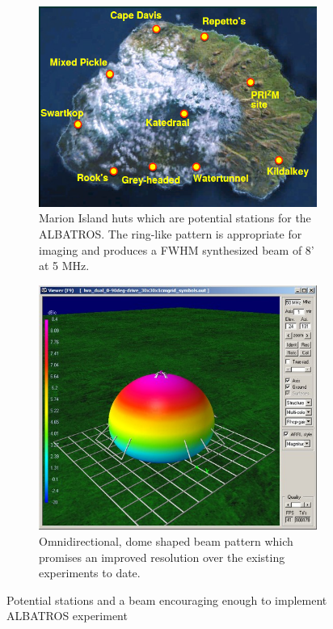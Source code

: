 \documentclass[12pt,a4paper]{report}
\begin{document}
		\begin{figure}[!htb]
			\centering
			\begin{subfigure}{.58\textwidth}
				\centering
				\includegraphics[width=.9\linewidth]{Figures/site.PNG}
				\caption{Marion Island huts which are potential stations for the ALBATROS. The ring-like pattern is appropriate for imaging and produces a FWHM synthesized beam of 8' at 5 MHz.}
				\label{Fig:Marion}
			\end{subfigure}%
			\begin{subfigure}{.45\textwidth}
				\centering
				\includegraphics[width=.9\linewidth]{Figures/beam.png}
				\caption{Omnidirectional, dome shaped beam pattern which promises an improved resolution over the existing experiments to date.}
				\label{Fig:beam}
			\end{subfigure}
			\caption{Potential stations and a beam encouraging enough to implement ALBATROS experiment}
			\label{Fig:10}
		\end{figure}
		
\end{document}
